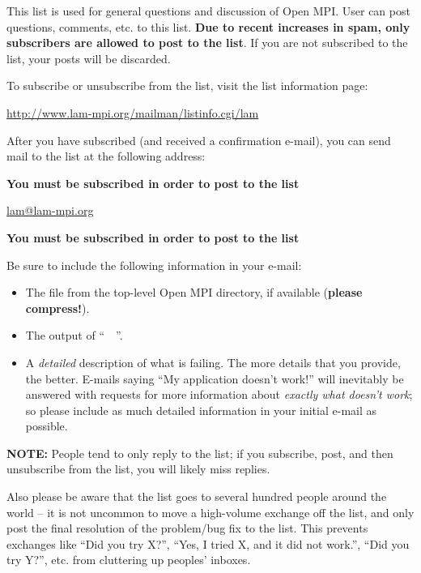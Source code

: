 This list is used for general questions and discussion of Open MPI.
User can post questions, comments, etc. to this list.  {\bf Due to
  recent increases in spam, only subscribers are allowed to post to
  the list}.  If you are not subscribed to the list, your posts will
be discarded.

To subscribe or unsubscribe from the list, visit the list information
page:

\vspace{11pt}
\centerline{\url{http://www.lam-mpi.org/mailman/listinfo.cgi/lam}}
\vspace{11pt}
  
After you have subscribed (and received a confirmation e-mail), you
can send mail to the list at the following address:
  
\vspace{11pt}
\centerline{{\bf You must be subscribed in order to post to the list}}
\centerline{\url{lam@lam-mpi.org}}
\centerline{{\bf You must be subscribed in order to post to the list}}
\vspace{11pt}

Be sure to include the following information in your e-mail:

\begin{itemize}
\item The  file from the top-level Open MPI directory, if
  available ({\bf please compress!}).
  
\item The output of ``\ \ ''.

\item A {\em detailed} description of what is failing.  The more
  details that you provide, the better.  E-mails saying ``My
  application doesn't work!'' will inevitably be answered with
  requests for more information about {\em exactly what doesn't work};
  so please include as much detailed information in your initial
  e-mail as possible.
\end{itemize}
  
{\bf NOTE:} People tend to only reply to the list; if you subscribe,
post, and then unsubscribe from the list, you will likely miss
replies.
  
Also please be aware that the list goes to several hundred people
around the world -- it is not uncommon to move a high-volume exchange
off the list, and only post the final resolution of the problem/bug
fix to the list.  This prevents exchanges like ``Did you try X?'',
``Yes, I tried X, and it did not work.'', ``Did you try Y?'', etc.
from cluttering up peoples' inboxes.

